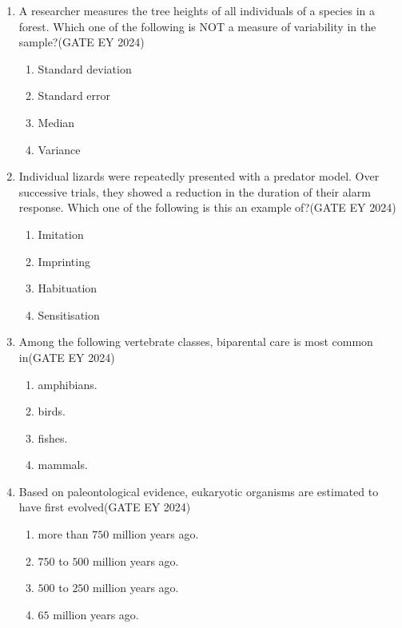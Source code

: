 \begin{enumerate}
\item A researcher measures the tree heights of all individuals of a species in a forest. Which one of the following is NOT a measure of variability in the sample?\hfill{(GATE EY 2024)}
    \begin{multicols}{2}
    \begin{enumerate}
        \item Standard deviation
        \item Standard error
        \item Median
        \item Variance
    \end{enumerate}
    \end{multicols}

\item Individual lizards were repeatedly presented with a predator model. Over successive trials, they showed a reduction in the duration of their alarm response. Which one of the following is this an example of?\hfill{(GATE EY 2024)}
    \begin{multicols}{2}
    \begin{enumerate}
        \item Imitation
        \item Imprinting
        \item Habituation
        \item Sensitisation
    \end{enumerate}
    \end{multicols}

\item Among the following vertebrate classes, biparental care is most common in\hfill{(GATE EY 2024)}
    \begin{multicols}{2}
    \begin{enumerate}
        \item amphibians.
        \item birds.
        \item fishes.
        \item mammals.
    \end{enumerate}
    \end{multicols}

\item Based on paleontological evidence, eukaryotic organisms are estimated to have first evolved\hfill{(GATE EY 2024)}
    \begin{enumerate}
        \item more than $750$ million years ago.
        \item $750$ to $500$ million years ago.
        \item $500$ to $250$ million years ago.
        \item $65$ million years ago.
    \end{enumerate}


\end{enumerate}

